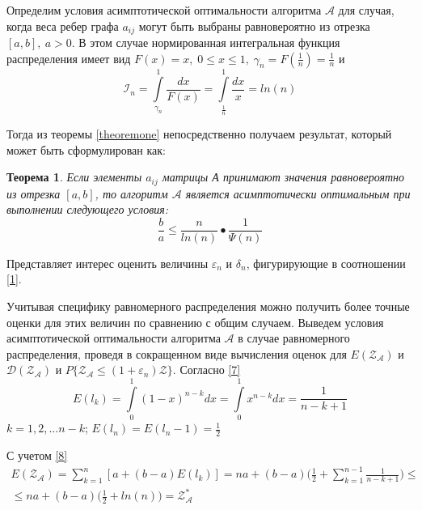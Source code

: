 \documentclass[a4paper, 14pt]{extarticle}
\numberwithin{equation}{section}
\newtheorem{theorem}{Теорема}[section]
\begin{document}
Определим условия асимптотической оптимальности алгоритма $\mathcal{A}$ для случая, когда веса ребер графа $a_{ij}$ могут быть выбраны равновероятно из отрезка $[a,b],\:  a>0$. В этом случае нормированная интегральная функция распределения имеет вид $F(x) = x,\; 0 \leqslant x \leqslant 1,\; \gamma_n = F(\frac{1}{n}) = \frac{1}{n}$ и
\begin{equation*}
\mathcal{I}_n = \int\limits_{\gamma_n}^1 \frac{dx}{F(x)} = \int\limits_{\frac{1}{n}}^1 \frac{dx}{x} = ln(n)
\end{equation*}

Тогда из теоремы \eqref{theoremone} непосредственно получаем результат, который может быть сформулирован как:\\

\begin{theorem}
\label{theoremtwo}
Если элементы $a_{ij}$ матрицы А принимают значения равновероятно из отрезка $[a,b]$, то алгоритм $\mathcal{A}$ является асимптотически оптимальным при выполнении следующего условия:
\begin{equation*}
\frac{b}{a} \leqslant \frac{n}{ln(n)}•\frac{1}{\Psi(n)}
\end{equation*}

\end{theorem}

Представляет интерес оценить величины $\varepsilon_n$ и $\delta_n$, фигурирующие в соотношении \eqref{1}.

Учитывая специфику равномерного распределения можно получить более точные оценки для этих величин по сравнению с общим случаем. Выведем условия асимптотической оптимальности алгоритма $\mathcal{A}$ в случае равномерного распределения, проведя в сокращенном виде вычисления оценок для $E(\mathcal{Z_{A}})$ и $\mathcal{D(Z_{A})}$ и $P \{ \mathcal{Z_{A}} \leqslant (1+\varepsilon_n)\mathcal{Z} \}$. Согласно \eqref{7}
\begin{equation}\label{eq13} 
E(l_k) = \int\limits_0^1 (1-x)^{n-k}dx = \int\limits_0^1 x^{n-k}dx = \frac{1}{n-k+1}
\end{equation}
$k=1,2,...n-k$;   $ E(l_n) = E(l_n-1) = \frac{1}{2}$

С учетом \eqref{8}
\begin{equation*}
\begin{aligned}
E(\mathcal{Z_{A}}) = \sum_{k=1}^{n} [a+(b-a)E(l_k)] = na +(b-a)\Big(\frac{1}{2}+\sum_{k=1}^{n-1} \frac{1}{n-k+1} \Big) \leqslant \\
\leqslant na+(b-a) \Big(\frac{1}{2} + ln(n) \Big) = \mathcal{Z^*_{A}}
\end{aligned}
\end{equation*}
\end{document}
